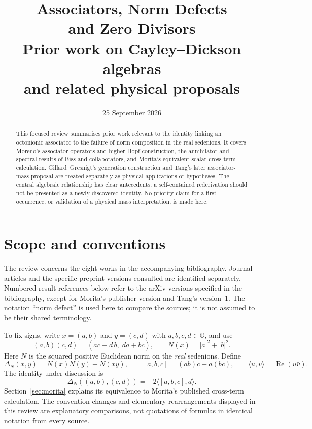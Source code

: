 \documentclass[11pt,a4paper]{article}
\title{\textbf{Associators, Norm Defects\\and Zero Divisors}\\[5pt]
  \large Prior work on Cayley--Dickson algebras\\and related physical proposals}
\author{}
\date{25 September 2026}
\newcommand{\OO}{\mathbb O}
\newcommand{\ip}[2]{\langle #1,#2\rangle}
\newcommand{\DN}{\Delta_N}
\DeclareMathOperator{\Rea}{Re}
\numberwithin{equation}{section}
\begin{document}
\maketitle
\vspace{-1.5em}
\begin{abstract}
This focused review summarises prior work relevant to the identity linking
an octonionic associator to the failure of norm composition in the real
sedenions. It covers Moreno's associator operators and higher Hopf
construction, the annihilator and spectral results of Biss and
collaborators, and Morita's equivalent scalar cross-term calculation.
Gillard--Gresnigt's generation construction and Tang's later associator-mass
proposal are treated separately as physical applications or hypotheses.
The central algebraic relationship has clear antecedents; a self-contained
rederivation should not be presented as a newly discovered identity.
No priority claim for a first occurrence, or validation of a physical mass
interpretation, is made here.
\end{abstract}

\section{Scope and conventions}

The review concerns the eight works in the accompanying bibliography.
Journal articles and the specific preprint versions consulted are
identified separately. Numbered-result references below refer to the
arXiv versions specified in the bibliography, except for Morita's
publisher version and Tang's version~1. The notation ``norm defect'' is
used here to compare the sources; it is not assumed to be their shared
terminology.

To fix signs, write $x=(a,b)$ and $y=(c,d)$ with $a,b,c,d\in\OO$, and use
\begin{equation}
 (a,b)(c,d)=(ac-\bar d\,b,\;da+b\bar c),
 \qquad N(x)=|a|^2+|b|^2.
 \label{eq:product}
\end{equation}
Here $N$ is the squared positive Euclidean norm on the \emph{real}
sedenions. Define
\begin{equation}
 \DN(x,y)=N(x)N(y)-N(xy),\qquad
 [a,b,c]=(ab)c-a(bc),\qquad
 \ip{u}{v}=\Rea(u\bar v).
 \label{eq:definitions}
\end{equation}
The identity under discussion is
\begin{equation}
 \boxed{\DN((a,b),(c,d))=-2\ip{[a,b,c]}{d}.}
 \label{eq:central}
\end{equation}
Section~\ref{sec:morita} explains its equivalence to Morita's published
cross-term calculation. The convention changes and elementary
rearrangements displayed in this review are explanatory comparisons,
not quotations of formulas in identical notation from every source.
\end{document}
